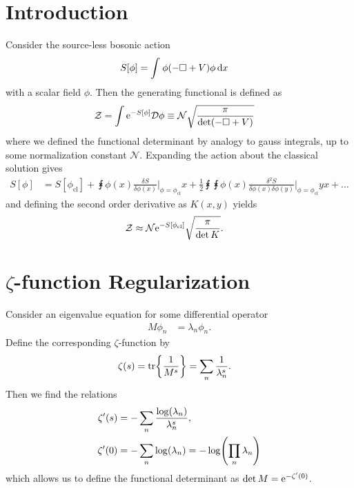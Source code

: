 \documentclass[english, parskip=full]{scrartcl}
\title{\titel}
\author{\autor}
\date{\today}
\begin{document}
\maketitle  %



\section{Introduction}
Consider the source-less bosonic action
\begin{align}
S[\phi] &= \intx{ }{ }{\phi \kla*{-\square + V}\phi}{x}
\end{align}
with a scalar field $\phi$.
Then the generating functional is defined as
\begin{align}
\mathcal{Z} &= \int \powe{-S[\phi]} \mathcal{D}\phi \equiv \mathcal{N} \sqrt{\frac{\pi}{\det \kla*{-\square + V}}}
\end{align}
where we defined the functional determinant by analogy to gauss integrals, up to some normalization constant $\mathcal{N}$.
Expanding the action about the classical solution gives
\begin{align}
S[\phi] &= S[\phi_\text{cl}] + \intx{ }{ }{\phi(x) \frac{\delta S}{\delta \phi(x)} \Big\vert_{\phi = \phi_\text{cl}}}{x} + \frac{1}{2} \intx{ }{ }{\intx{ }{ }{\phi(x) \frac{\delta^2 S}{\delta\phi(x) \delta\phi(y)} \Big\vert_{\phi = \phi_\text{cl}}}{y}}{x} + \dots
\end{align}
and defining the second order derivative as $K(x,y)$ yields
\begin{align}
\mathcal{Z} &\approx \mathcal{N} \text{e}^{-S[\phi_\text{cl}]} \sqrt{\frac{\pi}{\det K}}.
\end{align}
\section{$\zeta$-function Regularization}
Consider an eigenvalue equation for some differential operator
\begin{align}
M\phi_n &= \lambda_n\phi_n.
\end{align}
Define the corresponding $\zeta$-function by
\begin{align}
\zeta(s) &= \tr\klc*{\frac{1}{M^s}} = \sum_n \frac{1}{\lambda_n^s}.
\end{align}
Then we find the relations
\begin{align}
\zeta'(s) &= -\sum_n \frac{\log(\lambda_n)}{\lambda_n^s},\\
\zeta'(0) &= -\sum_n\log(\lambda_n) = -\log\kla*{\prod_n \lambda_n}
\end{align}
which allows us to define the functional determinant as $\det M = \text{e}^{-\zeta'(0)}$.
\end{document}
